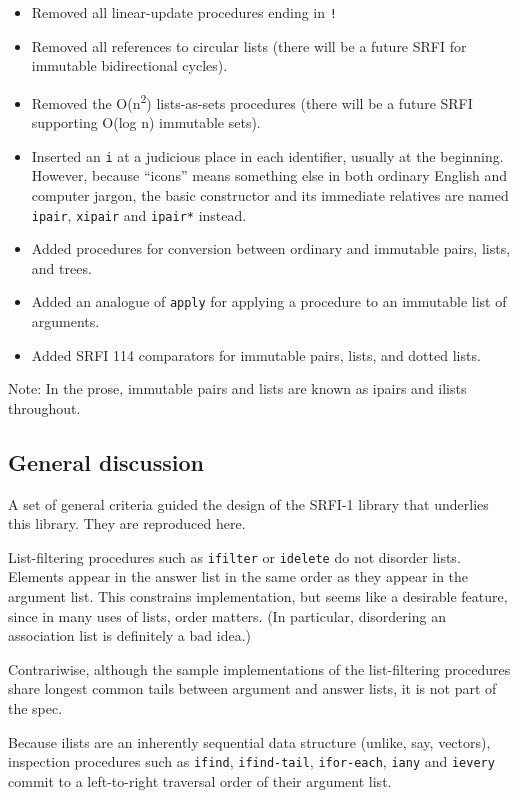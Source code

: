 \begin{itemize}
\tightlist
\item
  Removed all linear-update procedures ending in \texttt{!}
\item
  Removed all references to circular lists (there will be a future SRFI
  for immutable bidirectional cycles).
\item
  Removed the O(n\textsuperscript{2}) lists-as-sets procedures (there
  will be a future SRFI supporting O(log n) immutable sets).
\item
  Inserted an \texttt{i} at a judicious place in each identifier,
  usually at the beginning. However, because ``icons'' means something
  else in both ordinary English and computer jargon, the basic
  constructor and its immediate relatives are named \texttt{ipair},
  \texttt{xipair} and \texttt{ipair*} instead.
\item
  Added procedures for conversion between ordinary and immutable pairs,
  lists, and trees.
\item
  Added an analogue of \texttt{apply} for applying a procedure to an
  immutable list of arguments.
\item
  Added SRFI 114 comparators for immutable pairs, lists, and dotted
  lists.
\end{itemize}

Note: In the prose, immutable pairs and lists are known as ipairs and
ilists throughout.

\subsection{{General discussion}}

A set of general criteria guided the design of the SRFI-1 library that
underlies this library. They are reproduced here.

List-filtering procedures such as \texttt{ifilter} or \texttt{idelete}
do not disorder lists. Elements appear in the answer list in the same
order as they appear in the argument list. This constrains
implementation, but seems like a desirable feature, since in many uses
of lists, order matters. (In particular, disordering an association list
is definitely a bad idea.)

Contrariwise, although the sample implementations of the list-filtering
procedures share longest common tails between argument and answer lists,
it is not part of the spec.

Because ilists are an inherently sequential data structure (unlike, say,
vectors), inspection procedures such as \texttt{ifind},
\texttt{ifind-tail}, \texttt{ifor-each}, \texttt{iany} and
\texttt{ievery} commit to a left-to-right traversal order of their
argument list.

